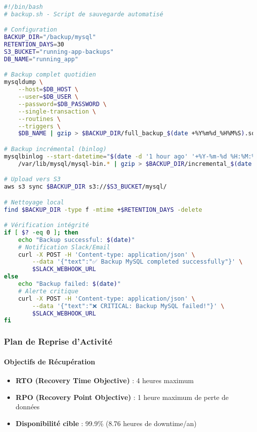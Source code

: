 \begin{lstlisting}[language=bash]
#!/bin/bash
# backup.sh - Script de sauvegarde automatisé

# Configuration
BACKUP_DIR="/backup/mysql"
RETENTION_DAYS=30
S3_BUCKET="running-app-backups"
DB_NAME="running_app"

# Backup complet quotidien
mysqldump \
    --host=$DB_HOST \
    --user=$DB_USER \
    --password=$DB_PASSWORD \
    --single-transaction \
    --routines \
    --triggers \
    $DB_NAME | gzip > $BACKUP_DIR/full_backup_$(date +%Y%m%d_%H%M%S).sql.gz

# Backup incrémental (binlog)
mysqlbinlog --start-datetime="$(date -d '1 hour ago' '+%Y-%m-%d %H:%M:%S')" \
    /var/lib/mysql/mysql-bin.* | gzip > $BACKUP_DIR/incremental_$(date +%Y%m%d_%H%M%S).sql.gz

# Upload vers S3
aws s3 sync $BACKUP_DIR s3://$S3_BUCKET/mysql/

# Nettoyage local
find $BACKUP_DIR -type f -mtime +$RETENTION_DAYS -delete

# Vérification intégrité
if [ $? -eq 0 ]; then
    echo "Backup successful: $(date)"
    # Notification Slack/Email
    curl -X POST -H 'Content-type: application/json' \
        --data '{"text":"✅ Backup MySQL completed successfully"}' \
        $SLACK_WEBHOOK_URL
else
    echo "Backup failed: $(date)"
    # Alerte critique
    curl -X POST -H 'Content-type: application/json' \
        --data '{"text":"❌ CRITICAL: Backup MySQL failed!"}' \
        $SLACK_WEBHOOK_URL
fi
\end{lstlisting}

\subsubsection{Plan de Reprise d'Activité}

\paragraph{Objectifs de Récupération}
\begin{itemize}
    \item \textbf{RTO (Recovery Time Objective)} : 4 heures maximum
    \item \textbf{RPO (Recovery Point Objective)} : 1 heure maximum de perte de données
    \item \textbf{Disponibilité cible} : 99.9\% (8.76 heures de downtime/an)
\end{itemize}

